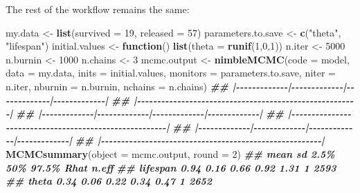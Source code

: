 \documentclass[
  12pt,
]{krantz}
\newenvironment{Shaded}{\begin{snugshade}}{\end{snugshade}}
\newcommand{\AttributeTok}[1]{\textcolor[rgb]{0.13,0.29,0.53}{#1}}
\newcommand{\ControlFlowTok}[1]{\textcolor[rgb]{0.13,0.29,0.53}{\textbf{#1}}}
\newcommand{\DecValTok}[1]{\textcolor[rgb]{0.00,0.00,0.81}{#1}}
\newcommand{\DocumentationTok}[1]{\textcolor[rgb]{0.56,0.35,0.01}{\textbf{\textit{#1}}}}
\newcommand{\FunctionTok}[1]{\textcolor[rgb]{0.13,0.29,0.53}{\textbf{#1}}}
\newcommand{\NormalTok}[1]{#1}
\newcommand{\OtherTok}[1]{\textcolor[rgb]{0.56,0.35,0.01}{#1}}
\newcommand{\StringTok}[1]{\textcolor[rgb]{0.31,0.60,0.02}{#1}}
\begin{document}
The rest of the workflow remains the same:

\begin{Shaded}
\begin{Highlighting}[]
\NormalTok{my.data }\OtherTok{\textless{}{-}} \FunctionTok{list}\NormalTok{(}\AttributeTok{survived =} \DecValTok{19}\NormalTok{, }\AttributeTok{released =} \DecValTok{57}\NormalTok{)}
\NormalTok{parameters.to.save }\OtherTok{\textless{}{-}} \FunctionTok{c}\NormalTok{(}\StringTok{"theta"}\NormalTok{, }\StringTok{"lifespan"}\NormalTok{)}
\NormalTok{initial.values }\OtherTok{\textless{}{-}} \ControlFlowTok{function}\NormalTok{() }\FunctionTok{list}\NormalTok{(}\AttributeTok{theta =} \FunctionTok{runif}\NormalTok{(}\DecValTok{1}\NormalTok{,}\DecValTok{0}\NormalTok{,}\DecValTok{1}\NormalTok{))}
\NormalTok{n.iter }\OtherTok{\textless{}{-}} \DecValTok{5000}
\NormalTok{n.burnin }\OtherTok{\textless{}{-}} \DecValTok{1000}
\NormalTok{n.chains }\OtherTok{\textless{}{-}} \DecValTok{3}
\NormalTok{mcmc.output }\OtherTok{\textless{}{-}} \FunctionTok{nimbleMCMC}\NormalTok{(}\AttributeTok{code =}\NormalTok{ model,}
                          \AttributeTok{data =}\NormalTok{ my.data,}
                          \AttributeTok{inits =}\NormalTok{ initial.values,}
                          \AttributeTok{monitors =}\NormalTok{ parameters.to.save,}
                          \AttributeTok{niter =}\NormalTok{ n.iter,}
                          \AttributeTok{nburnin =}\NormalTok{ n.burnin,}
                          \AttributeTok{nchains =}\NormalTok{ n.chains)}
\DocumentationTok{\#\# |{-}{-}{-}{-}{-}{-}{-}{-}{-}{-}{-}{-}{-}|{-}{-}{-}{-}{-}{-}{-}{-}{-}{-}{-}{-}{-}|{-}{-}{-}{-}{-}{-}{-}{-}{-}{-}{-}{-}{-}|{-}{-}{-}{-}{-}{-}{-}{-}{-}{-}{-}{-}{-}|}
\DocumentationTok{\#\# |{-}{-}{-}{-}{-}{-}{-}{-}{-}{-}{-}{-}{-}{-}{-}{-}{-}{-}{-}{-}{-}{-}{-}{-}{-}{-}{-}{-}{-}{-}{-}{-}{-}{-}{-}{-}{-}{-}{-}{-}{-}{-}{-}{-}{-}{-}{-}{-}{-}{-}{-}{-}{-}{-}{-}|}
\DocumentationTok{\#\# |{-}{-}{-}{-}{-}{-}{-}{-}{-}{-}{-}{-}{-}|{-}{-}{-}{-}{-}{-}{-}{-}{-}{-}{-}{-}{-}|{-}{-}{-}{-}{-}{-}{-}{-}{-}{-}{-}{-}{-}|{-}{-}{-}{-}{-}{-}{-}{-}{-}{-}{-}{-}{-}|}
\DocumentationTok{\#\# |{-}{-}{-}{-}{-}{-}{-}{-}{-}{-}{-}{-}{-}{-}{-}{-}{-}{-}{-}{-}{-}{-}{-}{-}{-}{-}{-}{-}{-}{-}{-}{-}{-}{-}{-}{-}{-}{-}{-}{-}{-}{-}{-}{-}{-}{-}{-}{-}{-}{-}{-}{-}{-}{-}{-}|}
\DocumentationTok{\#\# |{-}{-}{-}{-}{-}{-}{-}{-}{-}{-}{-}{-}{-}|{-}{-}{-}{-}{-}{-}{-}{-}{-}{-}{-}{-}{-}|{-}{-}{-}{-}{-}{-}{-}{-}{-}{-}{-}{-}{-}|{-}{-}{-}{-}{-}{-}{-}{-}{-}{-}{-}{-}{-}|}
\DocumentationTok{\#\# |{-}{-}{-}{-}{-}{-}{-}{-}{-}{-}{-}{-}{-}{-}{-}{-}{-}{-}{-}{-}{-}{-}{-}{-}{-}{-}{-}{-}{-}{-}{-}{-}{-}{-}{-}{-}{-}{-}{-}{-}{-}{-}{-}{-}{-}{-}{-}{-}{-}{-}{-}{-}{-}{-}{-}|}
\FunctionTok{MCMCsummary}\NormalTok{(}\AttributeTok{object =}\NormalTok{ mcmc.output, }\AttributeTok{round =} \DecValTok{2}\NormalTok{)}
\DocumentationTok{\#\#          mean   sd 2.5\%  50\% 97.5\% Rhat n.eff}
\DocumentationTok{\#\# lifespan 0.94 0.16 0.66 0.92  1.31    1  2593}
\DocumentationTok{\#\# theta    0.34 0.06 0.22 0.34  0.47    1  2652}
\end{Highlighting}
\end{Shaded}
\end{document}
